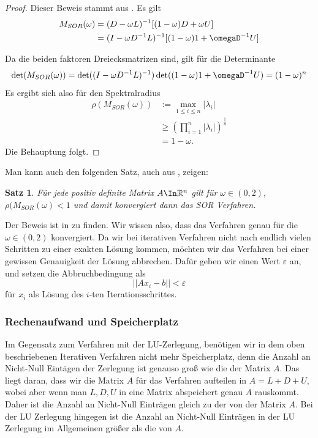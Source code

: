 \documentclass[smallheadings]{scrartcl}
\newtheorem{theorem}{Satz}
\theoremstyle{definition}
\begin{document}
			\begin{proof}
			Dieser Beweis stammt aus \citep{konvergenz}. Es gilt 
			\begin{align*}
			M_{SOR}(\omega )&=(D-\omega L)^{-1}[(1-\omega)D+\omega U]
			\\&=(I-\omega D^{-1}L)^{-1}[(1-\omega )1+\omegaD^{-1}U]
			\end{align*}
			
			Da die beiden faktoren Dreiecksmatrizen sind, gilt für die Determinante
			\begin{align*}
			\det (M_{SOR}(\omega ))=\det ((I-\omega D^{-1}L)^{-1})\det ((1-\omega )1+\omegaD^{-1}U)=(1-\omega )^n
			\end{align*}
			Es ergibt sich also für den Spektralradius 
			\begin{align*}
			\rho (M_{SOR}(\omega ))&:=\max_{1\leq i \leq n} |\lambda _i|\\
			&\geq \left( \prod_{i=1}^n|\lambda _i|\right) ^{\frac{1}{n}}
			\\&=1-\omega.
			\end{align*}
			Die Behauptung folgt.
			\end{proof}
			
			Man kann auch den folgenden Satz, auch aus \citep{konvergenz}, zeigen:
			\begin{theorem}
			Für jede positiv definite Matrix $A\In\mathbb{R}^n$ gilt für $\omega \in (0,2)$,
			$\rho (M_{SOR}(\omega )<1$ und damit konvergiert dann das SOR Verfahren.
			\end{theorem}
			Der Beweis ist in \citep{konvergenz} zu finden. 
			Wir wissen also, dass das Verfahren genau für die $\omega \in (0,2)$ konvergiert. 
			Da wir bei iterativen Verfahren nicht nach endlich vielen Schritten zu einer
			exakten Lösung kommen,  möchten wir das Verfahren bei einer gewissen
			Genauigkeit der Lösung abbrechen.  Dafür geben wir einen Wert $\varepsilon$ 
			an, und setzen die Abbruchbedingung als $$||Ax_i-b||<\varepsilon$$ für $x_i$ 
			als Lösung des $i$-ten Iterationsschrittes.  
			
		\subsubsection{Rechenaufwand und Speicherplatz}	
		
		Im Gegensatz zum Verfahren mit der 
		LU-Zerlegung,  benötigen wir in dem oben beschriebenen Iterativen Verfahren 
		nicht mehr Speicherplatz, denn die Anzahl an Nicht-Null Eintägen der Zerlegung 
		ist genauso groß wie die der Matrix $A$. Das liegt daran, dass wir die Matrix $A$ für das Verfahren aufteilen in $A=L+D+U$, wobei aber wenn man $L,D,U$ in eine Matrix abspeichert genau $A$ rauskommt. Daher ist die Anzahl an Nicht-Null Einträgen gleich zu der von der Matrix $A$. Bei der LU Zerlegung hingegen ist die Anzahl an Nicht-Null Einträgen in der LU Zerlegung im Allgemeinen größer als die von $A$.
		
\end{document}
